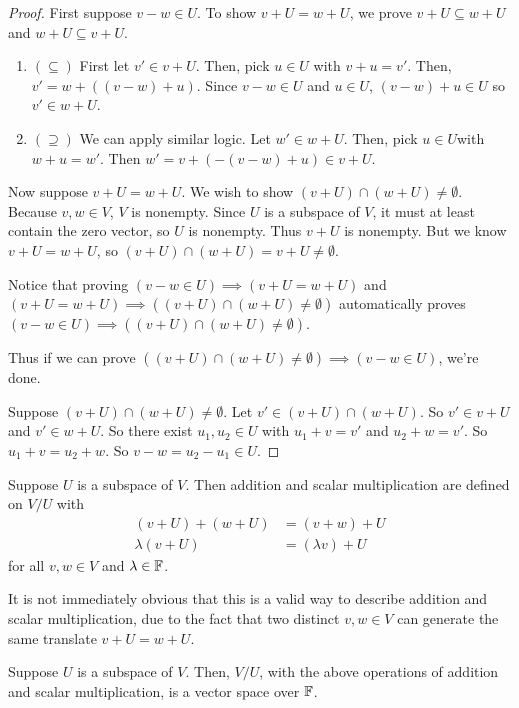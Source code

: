 \begin{proof}
    First suppose $v-w\in U$. To show $v+U = w+U$, we prove $v + U \subseteq w + U$ and $w + U \subseteq v + U$.
    \begin{enumerate}
        \item $(\subseteq)$ First let $v' \in v + U$. Then, pick $u \in U$ with $v + u = v'$. Then, $v' = w + ((v-w) + u)$. Since $v-w\in U$ and $u\in U$, $(v-w) + u \in U$ so $v' \in w + U$.
        \item $(\supseteq)$ We can apply similar logic. Let $w' \in w + U$. Then, pick $u \in U$with $w + u = w'$. Then $w' = v + (-(v-w) + u) \in v + U$.
    \end{enumerate}
    Now suppose $v + U = w + U$. We wish to show $(v+U)\cap (w+U) \ne \emptyset$. Because $v,w\in V$, $V$ is nonempty. Since $U$ is a subspace of $V$, it must at least contain the zero vector, so $U$ is nonempty. Thus $v + U$ is nonempty. But we know $v + U = w + U$, so $(v + U)\cap(w+U) = v + U \ne \emptyset$.

    Notice that proving $(v - w \in U) \implies (v + U = w + U)$ and $(v + U = w + U) \implies ((v + U) \cap (w + U) \ne \emptyset)$ automatically proves $(v-w\in U) \implies ((v+U)\cap(w+U)\ne \emptyset)$.

    Thus if we can prove $((v+U)\cap(w+U)\ne \emptyset) \implies (v-w\in U)$, we're done.

    Suppose $(v+U)\cap(w+U)\ne \emptyset$. Let $v' \in (v+U)\cap (w+U)$. So $v'\in v + U$ and $v'\in w + U$. So there exist $u_1,u_2\in U$ with $u_1 + v = v'$ and $u_2 + w = v'$. So $u_1 + v = u_2 + w$. So $v-w = u_2-u_1 \in U$.
\end{proof}
\begin{definition}
    Suppose $U$ is a subspace of $V$. Then addition and scalar multiplication are defined on $V/U$ with
    \begin{align*}
        (v + U) + (w + U) &= (v+w) + U \\
        \lambda (v + U) &= (\lambda v) + U
    \end{align*}
    for all $v,w\in V$ and $\lambda\in\mathbb F$.
\end{definition}
It is not immediately obvious that this is a valid way to describe addition and scalar multiplication, due to the fact that two distinct $v,w\in V$ can generate the same translate $v + U = w + U$. 
\begin{theorem}
    Suppose $U$ is a subspace of $V$. Then, $V/U$, with the above operations of addition and scalar multiplication, is a vector space over $\mathbb F$.
\end{theorem}
